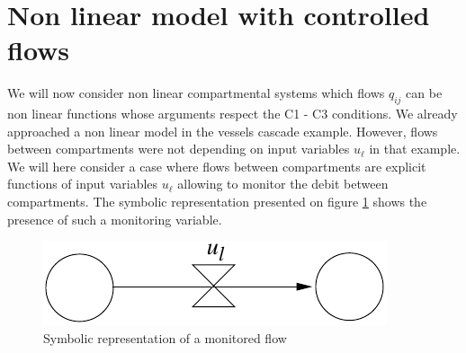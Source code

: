 \section{Non linear model with controlled flows}
We will now consider non linear compartmental systems which flows $q_{ij}$ can be non linear functions whose arguments respect the C1 - C3 conditions.
We already approached a non linear model in the vessels cascade example.
However, flows between compartments were not depending on input variables $u_{\ell}$ in that example.
We will here consider a case where flows between compartments are explicit functions of input variables $u_{\ell}$ 
allowing to monitor the debit between compartments.
The symbolic representation presented on figure \ref{Fig:contflux} shows the presence of such a monitoring variable.
\begin{figure}[ht] 
\begin{center}
\includegraphics{contflux}
\caption{Symbolic representation of a monitored flow}
\label{Fig:contflux}
\end{center} 
\end{figure}


